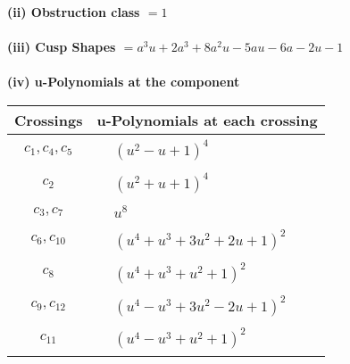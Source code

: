 \documentclass[1p]{elsarticle_modified}
\theoremstyle{definition}
\begin{document}
\flushleft \textbf{(ii) Obstruction class $= 1$}\\~\\
\flushleft \textbf{(iii) Cusp Shapes $= a^3 u+2 a^3+8 a^2 u-5 a u-6 a-2 u-1$}\\~\\
\newpage\renewcommand{\arraystretch}{1}
\flushleft \textbf{(iv) u-Polynomials at the component}\newline \\
\begin{tabular}{m{50pt}|m{274pt}}
Crossings & \hspace{64pt}u-Polynomials at each crossing \\
\hline $$\begin{aligned}c_{1},c_{4},c_{5}\end{aligned}$$&$\begin{aligned}
&(u^2- u+1)^4
\end{aligned}$\\
\hline $$\begin{aligned}c_{2}\end{aligned}$$&$\begin{aligned}
&(u^2+u+1)^4
\end{aligned}$\\
\hline $$\begin{aligned}c_{3},c_{7}\end{aligned}$$&$\begin{aligned}
&u^8
\end{aligned}$\\
\hline $$\begin{aligned}c_{6},c_{10}\end{aligned}$$&$\begin{aligned}
&(u^4+u^3+3 u^2+2 u+1)^2
\end{aligned}$\\
\hline $$\begin{aligned}c_{8}\end{aligned}$$&$\begin{aligned}
&(u^4+u^3+u^2+1)^2
\end{aligned}$\\
\hline $$\begin{aligned}c_{9},c_{12}\end{aligned}$$&$\begin{aligned}
&(u^4- u^3+3 u^2-2 u+1)^2
\end{aligned}$\\
\hline $$\begin{aligned}c_{11}\end{aligned}$$&$\begin{aligned}
&(u^4- u^3+u^2+1)^2
\end{aligned}$\\
\hline
\end{tabular}\\~\\
\end{document}
